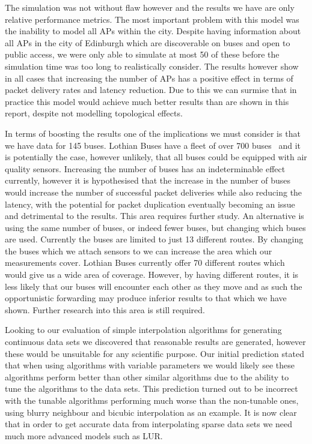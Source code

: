 The simulation was not without flaw however and the results we have are only relative performance metrics. The most important problem with this model was the inability to model all APs within the city. Despite having information about all APs in the city of Edinburgh which are discoverable on buses and open to public access, we were only able to simulate at most 50 of these before the simulation time was too long to realistically consider. The results however show in all cases that increasing the number of APs has a positive effect in terms of packet delivery rates and latency reduction. Due to this we can surmise that in practice this model would achieve much better results than are shown in this report, despite not modelling topological effects.

In terms of boosting the results one of the implications we must consider is that we have data for 145 buses. Lothian Buses have a fleet of over 700 buses~\cite{lothianbusannualreport} and it is potentially the case, however unlikely, that all buses could be equipped with air quality sensors. Increasing the number of buses has an indeterminable effect currently, however it is hypothesised that the increase in the number of buses would increase the number of successful packet deliveries while also reducing the latency, with the potential for packet duplication eventually becoming an issue and detrimental to the results. This area requires further study. An alternative is using the same number of buses, or indeed fewer buses, but changing which buses are used. Currently the buses are limited to just 13 different routes. By changing the buses which we attach sensors to we can increase the area which our measurements cover. Lothian Buses currently offer 70 different routes which would give us a wide area of coverage. However, by having different routes, it is less likely that our buses will encounter each other as they move and as such the opportunistic forwarding may produce inferior results to that which we have shown. Further research into this area is still required.

Looking to our evaluation of simple interpolation algorithms for generating continuous data sets we discovered that reasonable results are generated, however these would be unsuitable for any scientific purpose. Our initial prediction stated that when using algorithms with variable parameters we would likely see these algorithms perform better than other similar algorithms due to the ability to tune the algorithms to the data sets. This prediction turned out to be incorrect with the tunable algorithms performing much worse than the non-tunable ones, using blurry neighbour and bicubic interpolation as an example. It is now clear that in order to get accurate data from interpolating sparse data sets we need much more advanced models such as LUR.

